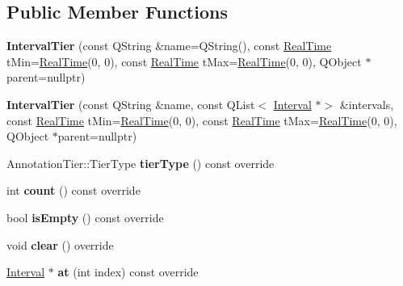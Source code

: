 \subsection*{Public Member Functions}
\begin{DoxyCompactItemize}
\item 
\mbox{\label{class_interval_tier_aff5f634bb75eab83ff00b6b19d4ebbef}} 
{\bfseries Interval\+Tier} (const Q\+String \&name=Q\+String(), const \hyperlink{struct_real_time}{Real\+Time} t\+Min=\hyperlink{struct_real_time}{Real\+Time}(0, 0), const \hyperlink{struct_real_time}{Real\+Time} t\+Max=\hyperlink{struct_real_time}{Real\+Time}(0, 0), Q\+Object $\ast$parent=nullptr)
\item 
\mbox{\label{class_interval_tier_a8a93849adf8e83da348bd17047df45bf}} 
{\bfseries Interval\+Tier} (const Q\+String \&name, const Q\+List$<$ \hyperlink{class_interval}{Interval} $\ast$$>$ \&intervals, const \hyperlink{struct_real_time}{Real\+Time} t\+Min=\hyperlink{struct_real_time}{Real\+Time}(0, 0), const \hyperlink{struct_real_time}{Real\+Time} t\+Max=\hyperlink{struct_real_time}{Real\+Time}(0, 0), Q\+Object $\ast$parent=nullptr)
\item 
\mbox{\label{class_interval_tier_a174014dbc1f85edffcb153894e616074}} 
Annotation\+Tier\+::\+Tier\+Type {\bfseries tier\+Type} () const override
\item 
\mbox{\label{class_interval_tier_a55bdb89e2b5ac8143ade88b4473a60ff}} 
int {\bfseries count} () const override
\item 
\mbox{\label{class_interval_tier_a630ea583423b2e7d2c65889153c01b4b}} 
bool {\bfseries is\+Empty} () const override
\item 
\mbox{\label{class_interval_tier_a34439ec265ac8c33635bbc6d03efca76}} 
void {\bfseries clear} () override
\item 
\mbox{\label{class_interval_tier_a61e20ee688d2478990f6600096f223af}} 
\hyperlink{class_interval}{Interval} $\ast$ {\bfseries at} (int index) const override
\item 
\mbox{\label{class_interval_tier_abf2293b6517f8710544575cad7c6ac92}} 
$$
\end{DoxyCompactItemize}
